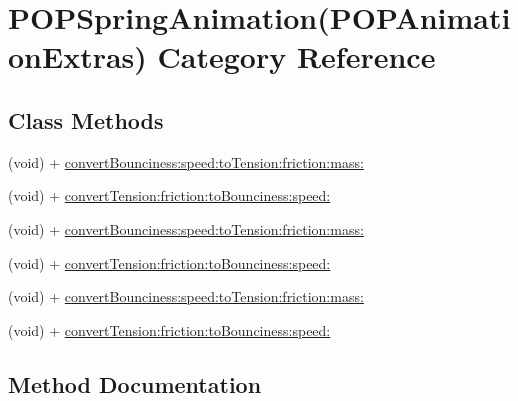 \hypertarget{category_p_o_p_spring_animation_07_p_o_p_animation_extras_08}{}\section{P\+O\+P\+Spring\+Animation(P\+O\+P\+Animation\+Extras) Category Reference}
\label{category_p_o_p_spring_animation_07_p_o_p_animation_extras_08}
\subsection*{Class Methods}
\begin{DoxyCompactItemize}
\item 
(void) + \mbox{\hyperlink{category_p_o_p_spring_animation_07_p_o_p_animation_extras_08_a64169073c5afd559e939783a7f3f4065}{convert\+Bounciness\+:speed\+:to\+Tension\+:friction\+:mass\+:}}
\item 
(void) + \mbox{\hyperlink{category_p_o_p_spring_animation_07_p_o_p_animation_extras_08_a6b5d0ffdb16b10c6de3575d9d45b831b}{convert\+Tension\+:friction\+:to\+Bounciness\+:speed\+:}}
\item 
(void) + \mbox{\hyperlink{category_p_o_p_spring_animation_07_p_o_p_animation_extras_08_a64169073c5afd559e939783a7f3f4065}{convert\+Bounciness\+:speed\+:to\+Tension\+:friction\+:mass\+:}}
\item 
(void) + \mbox{\hyperlink{category_p_o_p_spring_animation_07_p_o_p_animation_extras_08_a6b5d0ffdb16b10c6de3575d9d45b831b}{convert\+Tension\+:friction\+:to\+Bounciness\+:speed\+:}}
\item 
(void) + \mbox{\hyperlink{category_p_o_p_spring_animation_07_p_o_p_animation_extras_08_a64169073c5afd559e939783a7f3f4065}{convert\+Bounciness\+:speed\+:to\+Tension\+:friction\+:mass\+:}}
\item 
(void) + \mbox{\hyperlink{category_p_o_p_spring_animation_07_p_o_p_animation_extras_08_a6b5d0ffdb16b10c6de3575d9d45b831b}{convert\+Tension\+:friction\+:to\+Bounciness\+:speed\+:}}
\end{DoxyCompactItemize}


\subsection{Method Documentation}
\mbox{\label{category_p_o_p_spring_animation_07_p_o_p_animation_extras_08_a64169073c5afd559e939783a7f3f4065}} 
